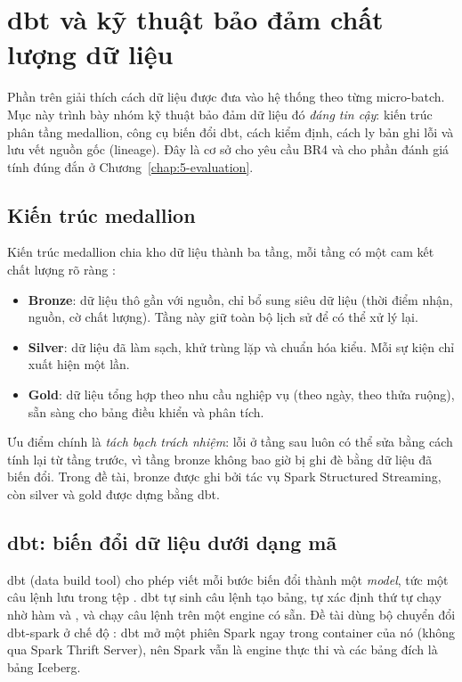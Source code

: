 \section{dbt và kỹ thuật bảo đảm chất lượng dữ liệu}
\label{sec:2-dbt-quality}

Phần trên giải thích cách dữ liệu được đưa vào hệ thống theo từng micro-batch. Mục này trình bày nhóm kỹ thuật bảo đảm dữ liệu đó \emph{đáng tin cậy}: kiến trúc phân tầng medallion, công cụ biến đổi dbt, cách kiểm định, cách ly bản ghi lỗi và lưu vết nguồn gốc (lineage). Đây là cơ sở cho yêu cầu BR4 và cho phần đánh giá tính đúng đắn ở Chương~\ref{chap:5-evaluation}.

\subsection{Kiến trúc medallion}
\label{sec:2-medallion}

Kiến trúc medallion chia kho dữ liệu thành ba tầng, mỗi tầng có một cam kết chất lượng rõ ràng \cite{databricks_medallion}:

\begin{itemize}
  \item \textbf{Bronze}: dữ liệu thô gần với nguồn, chỉ bổ sung siêu dữ liệu (thời điểm nhận, nguồn, cờ chất lượng). Tầng này giữ toàn bộ lịch sử để có thể xử lý lại.
  \item \textbf{Silver}: dữ liệu đã làm sạch, khử trùng lặp và chuẩn hóa kiểu. Mỗi sự kiện chỉ xuất hiện một lần.
  \item \textbf{Gold}: dữ liệu tổng hợp theo nhu cầu nghiệp vụ (theo ngày, theo thửa ruộng), sẵn sàng cho bảng điều khiển và phân tích.
\end{itemize}

Ưu điểm chính là \emph{tách bạch trách nhiệm}: lỗi ở tầng sau luôn có thể sửa bằng cách tính lại từ tầng trước, vì tầng bronze không bao giờ bị ghi đè bằng dữ liệu đã biến đổi. Trong đề tài, bronze được ghi bởi tác vụ Spark Structured Streaming, còn silver và gold được dựng bằng dbt.

\subsection{dbt: biến đổi dữ liệu dưới dạng mã}
\label{sec:2-dbt}

dbt (data build tool) cho phép viết mỗi bước biến đổi thành một \emph{model}, tức một câu lệnh  lưu trong tệp  \cite{dbt_docs}. dbt tự sinh câu lệnh tạo bảng, tự xác định thứ tự chạy nhờ hàm  và , và chạy câu lệnh trên một engine có sẵn. Đề tài dùng bộ chuyển đổi dbt-spark ở chế độ : dbt mở một phiên Spark ngay trong container của nó (không qua Spark Thrift Server), nên Spark vẫn là engine thực thi và các bảng đích là bảng Iceberg.

